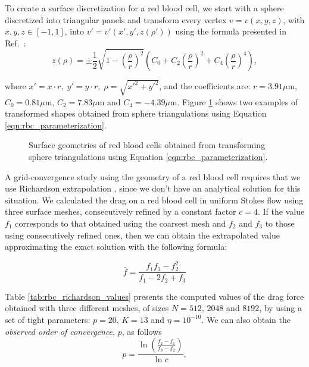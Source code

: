 \documentclass[smallcondensed,final]{svjour3}
\begin{document}
To create a surface discretization for a red blood cell, we start with a sphere discretized into triangular panels and transform every vertex $v = v(x,y,z)$, with $x,y,z\in [-1,1]$, into $v' = v'(x',y',z(\rho'))$ using the formula presented in Ref.~\cite{EvansFung1972}:
%
\begin{equation}
	\label{eqn:rbc_parameterization}
	z(\rho) = \pm \frac{1}{2}\sqrt{1 - \left(\frac{\rho}{r}\right)^{2}}\left ( C_0 + C_2 \left(\frac{\rho}{r}\right)^{2} + C_4\left(\frac{\rho}{r}\right)^{4}\right ),
\end{equation}

\noindent where $x' = x\cdot r,\; y' = y\cdot r,\; \rho = \sqrt{x'^{2}+y'^{2}}$, and the coefficients are: $r=3.91\mu$m,  $C_0= 0.81\mu$m, $C_2= 7.83\mu$m and $C_4=-4.39\mu$m.
Figure \ref{fig:glob_rbc} shows two examples of transformed shapes obtained from sphere triangulations using Equation \eqref{eqn:rbc_parameterization}.


\begin{figure}%
\begin{center}
	 \qquad
	\caption{Surface geometries of red blood cells obtained from transforming sphere triangulations using Equation \eqref{eqn:rbc_parameterization}.}
	\label{fig:glob_rbc}
\end{center}
\end{figure}

A grid-convergence study using the geometry of a red blood cell requires that we use Richardson extrapolation \cite{roache1998}, since we don't have an analytical solution for this situation. We calculated the drag on a red blood cell in uniform Stokes flow using three surface meshes, consecutively refined by a constant factor $c=4$. 
If the value $f_1$ corresponds to that obtained using the coarsest mesh and $f_2$ and $f_3$ to those using consecutively refined ones, then we can obtain the extrapolated value approximating the exact solution with the following formula:

\begin{equation}
	\bar{f} = \frac{f_1f_3-f_2^{2}}{f_1 -2f_2+f_3}
\end{equation}

Table \ref{tab:rbc_richardson_values} presents the computed values of the drag force obtained with three different meshes, of sizes $N=512$, $2048$ and $8192$, by using a set of tight parameters: $p=20$, $K=13$ and $\eta=10^{-10}$. We can also obtain the \emph{observed order of convergence}, $p$, as follows
%
\begin{equation}
	p = \frac{\ln{\left(\frac{f_2-f_1}{f_3-f_2}\right)}}{\ln{c}},
\end{equation}
\end{document}
